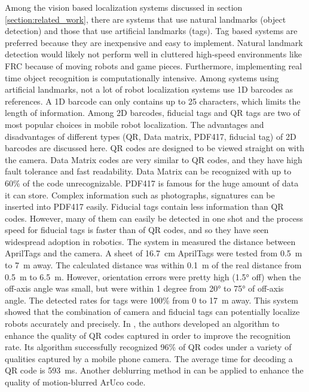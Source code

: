 \documentclass{article}
\begin{document}
  Among the vision based localization systems discussed in section \ref{section:related_work}, there are systems that use natural landmarks (object detection) and those that use artificial landmarks (tags). Tag based systems are preferred because they are inexpensive and easy to implement. Natural landmark detection would likely not perform well in cluttered high-speed environments like FRC because of moving robots and game pieces. Furthermore, implementing real time object recognition is computationally intensive. Among systems using artificial landmarks, not a lot of robot localization systems use 1D barcodes as references. A 1D barcode can only contains up to 25 characters, which limits the length of information. Among 2D barcodes, fiducial tags and QR tags are two of most popular choices in mobile robot localization. The advantages and disadvantages of different types (QR, Data matrix, PDF417, fiducial tag) of 2D barcodes are discussed here. QR codes are designed to be viewed straight on with the camera. Data Matrix codes are very similar to QR codes, and they have high fault tolerance and fast readability. Data Matrix can be recognized with up to 60\% of the code unrecognizable. PDF417 is famous for the huge amount of data it can store. Complex information such as photographs, signatures can be inserted into PDF417 easily. Fiducial tags contain less information than QR codes. However, many of them can easily be detected in one shot and the process speed for fiducial tags is faster than of QR codes, and so they have seen widespread adoption in robotics. The system in \cite{wang_apriltag_2016} measured the distance between AprilTags and the camera. A sheet of \SI{16.7}{\centi\meter} AprilTags were tested from \SI {0.5}{\meter} to \SI{7}{\meter} away. The calculated distance was within \SI{0.1}{\meter} of the real distance from \SI{0.5}{\meter} to \SI{6.5}{\meter}. However, orientation errors were pretty high (\ang{1.5} off) when the off-axis angle was small, but were within 1 degree from \ang{20} to \ang{75} of off-axis angle. The detected rates for tags were 100\% from 0 to \SI{17}{\meter} away. This system showed that the combination of camera and fiducial tags can potentially localize robots accurately and precisely. In \cite{chen_two-stage_2013}, the authors developed an algorithm to enhance the quality of QR codes captured in order to improve the recognition rate. Its algorithm successfully recognized 96\% of QR codes under a variety of qualities captured by a mobile phone camera. The average time for decoding a QR code is \SI{593}{\milli\second}. Another deblurring method in \cite{xu_2d_2011} can be applied to enhance the quality of motion-blurred ArUco code.
\end{document}

